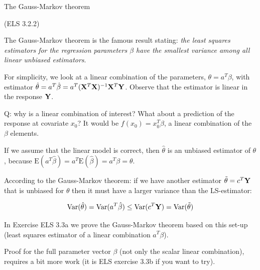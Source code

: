 \documentclass[
  ignorenonframetext,
]{beamer}
\begin{document}
\begin{frame}

\begin{block}{The Gauss-Markov theorem}

(ELS 3.2.2)

The Gauss-Markov theorem is the famous result stating: \emph{the least
squares estimators for the regression parameters \(\beta\) have the
smallest variance among all linear unbiased estimators}.

For simplicity, we look at a linear combination of the parameters,
\(\theta=a^T \beta\), with estimator
\(\hat{\theta}=a^T \hat{\beta}=a^T ({\bf X}^T{\bf X})^{-1} {\bf X}^T {\bf Y}\).
Observe that the estimator is linear in the response \({\bf Y}\).

Q: why is a linear combination of interest? What about a prediction of
the response at covariate \(x_0\)? It would be \(f(x_0)=x_0^T \beta\), a
linear combination of the \(\beta\) elements.

If we assume that the linear model is correct, then \(\hat{\theta}\) is
an unbiased estimator of \(\theta\), because
\(\text{E}(a^T \hat{\beta})=a^T \text{E}(\hat{\beta})=a^T\beta=\theta\).

According to the Gauss-Markov theorem: if we have another estimator
\(\tilde{\theta}=c^T{\bf Y}\) that is unbiased for \(\theta\) then it
must have a larger variance than the LS-estimator:

\[\text{Var}(\hat{\theta})=\text{Var}(a^T \hat{\beta})\le \text{Var}(c^T{\bf Y})=\text{Var}(\tilde{\theta})\]

\end{block}

\end{frame}

\begin{frame}

In Exercise ELS 3.3a we prove the Gauss-Markov theorem based on this
set-up (least squares estimator of a linear combination \(a^T\beta\)).

Proof for the full parameter vector \(\beta\) (not only the scalar
linear combination), requires a bit more work (it is ELS exercise 3.3b
if you want to try).

\end{frame}
\end{document}
